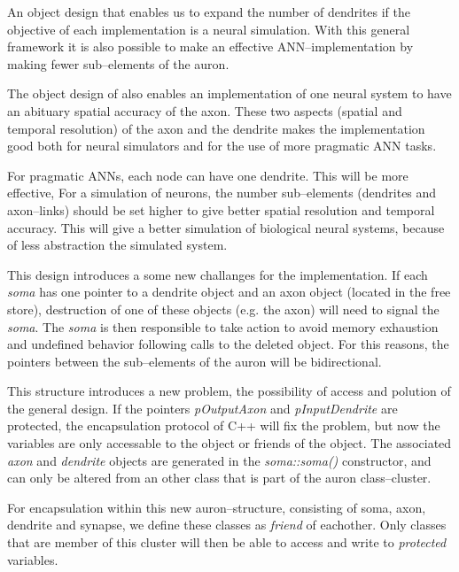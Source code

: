	An object design that enables us to expand the number of dendrites if the objective of each implementation is a neural simulation. 
	With this general framework it is also possible to make an effective ANN--implementation by making fewer sub--elements of the auron.

	The object design of also enables an implementation of one neural system to have an abituary spatial accuracy of the axon. 
	These two aspects (spatial and temporal resolution) of the axon and the dendrite makes the implementation good both for neural simulators and for the use of more pragmatic ANN tasks.

	For pragmatic ANNs, each node can have one dendrite. This will be more effective,
	For a simulation of neurons, the number sub--elements (dendrites and axon--links) should be set higher to give better spatial resolution and temporal accuracy. 
	This will give a better simulation of biological neural systems, because of less abstraction the simulated system.

	
	This design introduces a some new challanges for the implementation. 
	If each \emph{soma} has one pointer to a dendrite object and an axon object (located in the free store), destruction of one of these objects (e.g. the axon) will need to signal the \emph{soma}. 
	The \emph{soma} is then responsible to take action to avoid memory exhaustion and undefined behavior following calls to the deleted object.%
	For this reasons, the pointers between the sub--elements of the auron will be bidirectional. 

	This structure introduces a new problem, the possibility of access and polution of the general design. 
	If the pointers \emph{pOutputAxon} and \emph{pInputDendrite} are protected, the encapsulation protocol of C++ will fix the problem, but now the variables are only accessable to the object or friends of the object.
	The associated \emph{axon} and \emph{dendrite} objects are generated in the \emph{soma::soma()} constructor, and can only be altered from an other class that is part of the auron class--cluster.%

	For encapsulation within this new auron--structure, consisting of soma, axon, dendrite and synapse, we define these classes as \emph{friend} of eachother. 
	Only classes that are member of this cluster will then be able to access and write to \emph{protected} variables.


